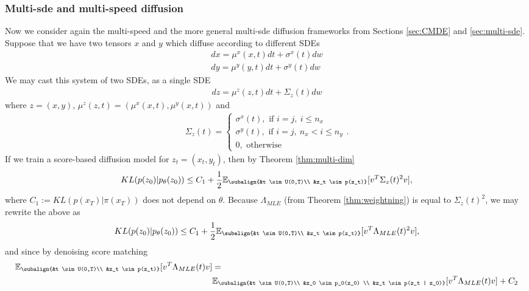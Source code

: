 \subsubsection{Multi-sde and multi-speed diffusion}
Now we consider again the multi-speed and the more general multi-sde diffusion frameworks from Sections \ref{sec:CMDE} and \ref{sec:multi-sde}. Suppose that we have two tensors $x$ and $y$ which diffuse according to different SDEs
\begin{gather*}
    dx = \mu^x(x,t)dt+\sigma^x(t)dw  \\
    dy = \mu^y(y,t)dt+\sigma^y(t)dw  
\end{gather*}
We may cast this system of two SDEs, as a single SDE
\begin{gather*}
    dz = \mu^z(z,t)dt+ \Sigma_z(t)dw 
\end{gather*}
where $z = (x,y)$, $\mu^z(z,t) = (\mu^x(x,t), \mu^y(x,t))$ and 
\begin{gather*}
    \Sigma_z(t) =  
    \begin{cases} 
        \sigma^x(t), \text{ if } i=j, \ i \leq n_x \\ 
        \sigma^y(t), \text{ if } i=j, \ n_x < i \leq n_y  \\
        0, \text{ otherwise}
    \end{cases}
    .            
\end{gather*}
If we train a score-based diffusion model for $z_t = (x_t, y_t)$, then by Theorem \ref{thm:multi-dim}
\begin{align*}
    KL(p(z_0) | p_\theta(z_0)) \leq C_1 + \frac{1}{2} \mathbb{E}_{\subalign{&t \sim U(0,T)\\ &z_t \sim p(z_t)}} 
    [
        v^T \Sigma_z(t)^2 v
    ],
\end{align*}
where $C_1 := KL(p(x_T) | \pi(x_T)) $ does not depend on $\theta$.
Because $\Lambda_{MLE}$ (from Theorem \ref{thm:weightning}) is equal to $\Sigma_z(t)^2$, we may rewrite the above as 
\begin{align*}
    KL(p(z_0) | p_\theta(z_0)) \leq C_1 + \frac{1}{2} \mathbb{E}_{\subalign{&t \sim U(0,T)\\ &z_t \sim p(z_t)}} 
    [
        v^T \Lambda_{MLE}(t)^2 v
    ],
\end{align*}
and since by denoising score matching \cite{vincent2011connection} 
\begin{align*}
    \mathbb{E}_{\subalign{&t \sim U(0,T)\\ &z_t \sim p(z_t)}} 
[
    v^T \Lambda_{MLE}(t) v
] &= 
\\ &\mathbb{E}_{\subalign{&t \sim U(0,T)\\ &z_0 \sim p_0(z_0) \\ &z_t \sim p(z_t | z_0)}} 
[
    v^T \Lambda_{MLE}(t) v
] + C_2
\end{align*}
